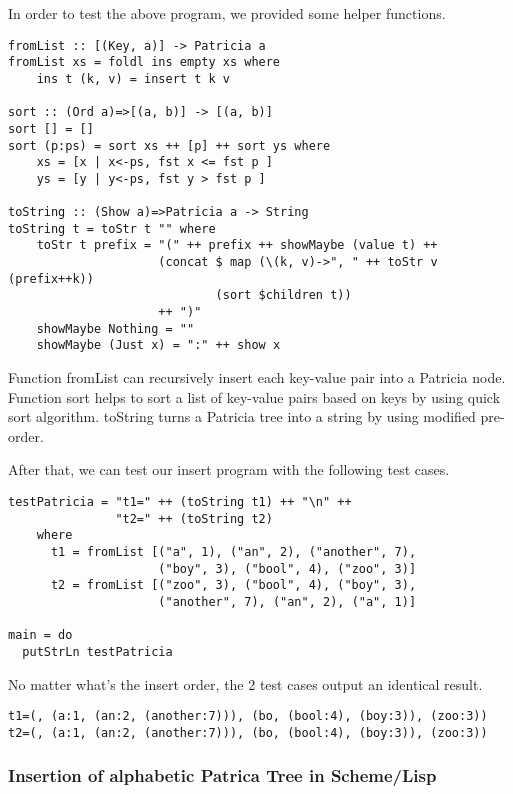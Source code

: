 \documentclass{article}
\begin{document}
In order to test the above program, we provided some helper functions.

\begin{lstlisting}
fromList :: [(Key, a)] -> Patricia a
fromList xs = foldl ins empty xs where
    ins t (k, v) = insert t k v

sort :: (Ord a)=>[(a, b)] -> [(a, b)]
sort [] = []
sort (p:ps) = sort xs ++ [p] ++ sort ys where
    xs = [x | x<-ps, fst x <= fst p ]
    ys = [y | y<-ps, fst y > fst p ]

toString :: (Show a)=>Patricia a -> String
toString t = toStr t "" where
    toStr t prefix = "(" ++ prefix ++ showMaybe (value t) ++
                     (concat $ map (\(k, v)->", " ++ toStr v (prefix++k))
                             (sort $children t))
                     ++ ")"
    showMaybe Nothing = ""
    showMaybe (Just x) = ":" ++ show x
\end{lstlisting}

Function fromList can recursively insert each key-value pair into a Patricia node.
Function sort helps to sort a list of key-value pairs based on keys by using quick sort
algorithm. toString turns a Patricia tree into a string by using modified pre-order.

After that, we can test our insert program with the following test cases.

\begin{lstlisting}
testPatricia = "t1=" ++ (toString t1) ++ "\n" ++
               "t2=" ++ (toString t2)
    where
      t1 = fromList [("a", 1), ("an", 2), ("another", 7), 
                     ("boy", 3), ("bool", 4), ("zoo", 3)]
      t2 = fromList [("zoo", 3), ("bool", 4), ("boy", 3), 
                     ("another", 7), ("an", 2), ("a", 1)]

main = do
  putStrLn testPatricia
\end{lstlisting}

No matter what's the insert order, the 2 test cases output an identical result.

\begin{verbatim}
t1=(, (a:1, (an:2, (another:7))), (bo, (bool:4), (boy:3)), (zoo:3))
t2=(, (a:1, (an:2, (another:7))), (bo, (bool:4), (boy:3)), (zoo:3))
\end{verbatim}


\subsubsection*{Insertion of alphabetic Patrica Tree in Scheme/Lisp}
\end{document}

